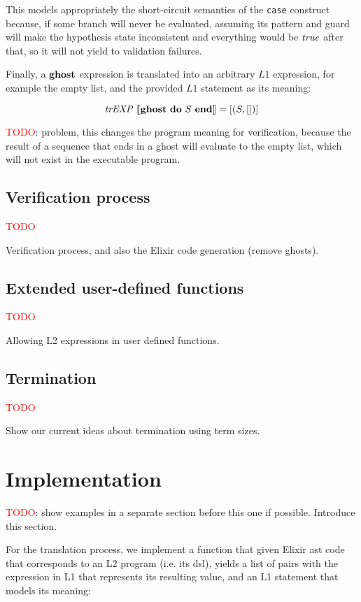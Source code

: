 This models appropriately the short-circuit semantics of the \verb|case| construct
because, if some branch will never be evaluated, assuming its pattern and guard will
make the hypothesis state inconsistent and everything would be $\mathit{true}$ after that,
so it will not yield to validation failures.

Finally, a $\textbf{ghost}$ expression is translated into an arbitrary $L1$
expression, for example the empty list, and the provided $L1$ statement as its 
meaning:

\[
\mathit{trEXP}~\llbracket\textbf{ghost}~\textbf{do}~S~\textbf{end}\rrbracket = [(S, [])]
\]

\textcolor{red}{TODO}: problem, this changes the program meaning for verification,
because the result of a sequence that ends in a ghost will evaluate to the empty list,
which will not exist in the executable program. 

\subsection{Verification process}

\textcolor{red}{TODO}

Verification process, and also the Elixir code generation (remove ghosts).

\subsection{Extended user-defined functions}

\textcolor{red}{TODO}

Allowing L2 expressions in user defined functions.

\subsection{Termination}

\textcolor{red}{TODO}

Show our current ideas about termination using term sizes.

\section{Implementation}

\textcolor{red}{TODO}: show examples in a separate section before this one if possible. Introduce this section.

For the translation process, we implement a function that given Elixir \gls{ast} 
code that corresponds to an L2 program (i.e. its \gls{dsl}), yields a list of pairs
with the expression in L1 that represents its resulting value, and an L1 statement that 
models its meaning:


